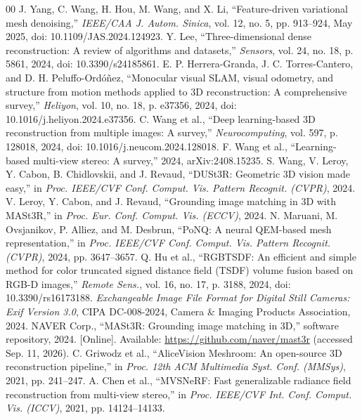 \documentclass[conference]{IEEEtran}
\begin{document}
\begin{thebibliography}{00}
 J. Yang, C. Wang, H. Hou, M. Wang, and X. Li, ``Feature-driven variational mesh denoising,'' \textit{IEEE/CAA J. Autom. Sinica}, vol. 12, no. 5, pp. 913--924, May 2025, doi: 10.1109/JAS.2024.124923.
 Y. Lee, ``Three-dimensional dense reconstruction: A review of algorithms and datasets,'' \textit{Sensors}, vol. 24, no. 18, p. 5861, 2024, doi: 10.3390/s24185861.
 E. P. Herrera-Granda, J. C. Torres-Cantero, and D. H. Peluffo-Ord\'o\~nez, ``Monocular visual SLAM, visual odometry, and structure from motion methods applied to 3D reconstruction: A comprehensive survey,'' \textit{Heliyon}, vol. 10, no. 18, p. e37356, 2024, doi: 10.1016/j.heliyon.2024.e37356.
 C. Wang et al., ``Deep learning-based 3D reconstruction from multiple images: A survey,'' \textit{Neurocomputing}, vol. 597, p. 128018, 2024, doi: 10.1016/j.neucom.2024.128018.
 F. Wang et al., ``Learning-based multi-view stereo: A survey,'' 2024, arXiv:2408.15235.
 S. Wang, V. Leroy, Y. Cabon, B. Chidlovskii, and J. Revaud, ``DUSt3R: Geometric 3D vision made easy,'' in \textit{Proc. IEEE/CVF Conf. Comput. Vis. Pattern Recognit. (CVPR)}, 2024.
 V. Leroy, Y. Cabon, and J. Revaud, ``Grounding image matching in 3D with MASt3R,'' in \textit{Proc. Eur. Conf. Comput. Vis. (ECCV)}, 2024.
 N. Maruani, M. Ovsjanikov, P. Alliez, and M. Desbrun, ``PoNQ: A neural QEM-based mesh representation,'' in \textit{Proc. IEEE/CVF Conf. Comput. Vis. Pattern Recognit. (CVPR)}, 2024, pp. 3647--3657.
 Q. Hu et al., ``RGBTSDF: An efficient and simple method for color truncated signed distance field (TSDF) volume fusion based on RGB-D images,'' \textit{Remote Sens.}, vol. 16, no. 17, p. 3188, 2024, doi: 10.3390/rs16173188.
 \textit{Exchangeable Image File Format for Digital Still Cameras: Exif Version 3.0}, CIPA DC-008-2024, Camera \& Imaging Products Association, 2024.
 NAVER Corp., ``MASt3R: Grounding image matching in 3D,'' software repository, 2024. [Online]. Available: \url{https://github.com/naver/mast3r} (accessed Sep. 11, 2026).
 C. Griwodz et al., ``AliceVision Meshroom: An open-source 3D reconstruction pipeline,'' in \textit{Proc. 12th ACM Multimedia Syst. Conf. (MMSys)}, 2021, pp. 241--247.
 A. Chen et al., ``MVSNeRF: Fast generalizable radiance field reconstruction from multi-view stereo,'' in \textit{Proc. IEEE/CVF Int. Conf. Comput. Vis. (ICCV)}, 2021, pp. 14124--14133.

\end{thebibliography}
\end{document}
